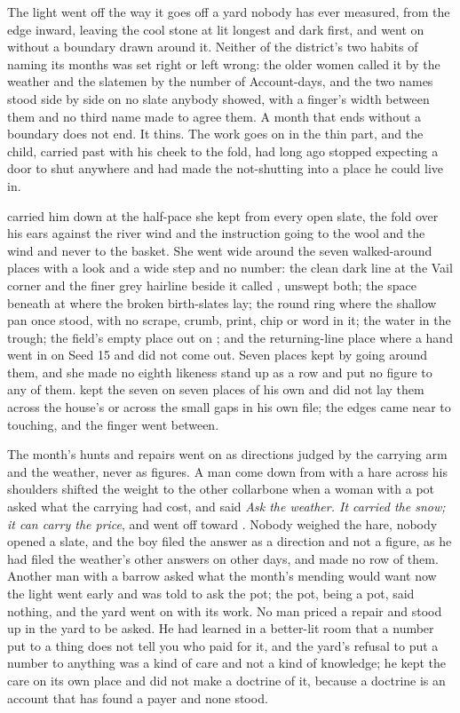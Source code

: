 The light went off  the way it goes off a yard nobody has ever measured, from the edge inward, leaving the cool stone at  lit longest and  dark first, and  went on without a boundary drawn around it. Neither of the district's two habits of naming its months was set right or left wrong: the older women called it by the weather and the slatemen by the number of Account-days, and the two names stood side by side on no slate anybody showed, with a finger's width between them and no third name made to agree them. A month that ends without a boundary does not end. It thins. The work goes on in the thin part, and the child, carried past with his cheek to the fold, had long ago stopped expecting a door to shut anywhere and had made the not-shutting into a place he could live in.

 carried him down at the half-pace she kept from every open slate, the fold over his ears against the river wind and the instruction going to the wool and the wind and never to the basket. She went wide around the seven walked-around places with a look and a wide step and no number: the clean dark line at the Vail corner and the finer grey hairline beside it called , unswept both; the space beneath  at  where the broken birth-slates lay; the round ring where the shallow pan once stood, with no scrape, crumb, print, chip or word in it; the water in the trough; the field's empty place out on ; and the returning-line place where a hand went in on Seed 15 and did not come out. Seven places kept by going around them, and she made no eighth likeness stand up as a row and put no figure to any of them.  kept the seven on seven places of his own and did not lay them across the house's  or across the small gaps in his own file; the edges came near to touching, and the finger went between.

The month's hunts and repairs went on as directions judged by the carrying arm and the weather, never as figures. A man come down from  with a hare across his shoulders shifted the weight to the other collarbone when a woman with a pot asked what the carrying had cost, and said \emph{Ask the weather. It carried the snow; it can carry the price}, and went off toward . Nobody weighed the hare, nobody opened a slate, and the boy filed the answer as a direction and not a figure, as he had filed the weather's other answers on other days, and made no row of them. Another man with a barrow asked what the month's mending would want now the light went early and was told to ask the pot; the pot, being a pot, said nothing, and the yard went on with its work. No man priced a repair and stood up in the yard to be asked. He had learned in a better-lit room that a number put to a thing does not tell you who paid for it, and the yard's refusal to put a number to anything was a kind of care and not a kind of knowledge; he kept the care on its own place and did not make a doctrine of it, because a doctrine is an account that has found a payer and none stood.

